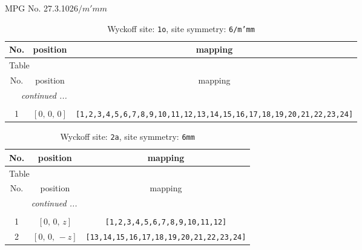 \documentclass[fleqn,8pt]{jsarticle}
\begin{document}
\setcounter{MaxMatrixCols}{32}

\renewcommand{\tablename}{Table~}
\renewcommand{\figurename}{Figure~}
\begin{center}
\LARGE
MPG No. 27.3.102\quad$6/m'mm$
\end{center}
\renewcommand{\arraystretch}{1.2}
\begin{longtable}{ccc}
\caption{Wyckoff site: {\tt 1o}, site symmetry: {\tt 6/m'mm}}
 \\
 \hline \hline
No. & position & mapping \\ \hline \endfirsthead

\multicolumn{2}{l}{\tablename\ \thetable{}} \\
 \hline \hline
No. & position & mapping \\ \hline \endhead

 \hline \hline
\multicolumn{2}{r}{\footnotesize\it continued ...} \\ \endfoot

 \hline \hline
\multicolumn{2}{r}{} \\ \endlastfoot

1 & $\left[ 0,\, 0,\, 0 \right]$ & {\tt [1,2,3,4,5,6,7,8,9,10,11,12,13,14,15,16,17,18,19,20,21,22,23,24]} \\
\end{longtable}
\renewcommand{\arraystretch}{1.2}
\begin{longtable}{ccc}
\caption{Wyckoff site: {\tt 2a}, site symmetry: {\tt 6mm}}
 \\
 \hline \hline
No. & position & mapping \\ \hline \endfirsthead

\multicolumn{2}{l}{\tablename\ \thetable{}} \\
 \hline \hline
No. & position & mapping \\ \hline \endhead

 \hline \hline
\multicolumn{2}{r}{\footnotesize\it continued ...} \\ \endfoot

 \hline \hline
\multicolumn{2}{r}{} \\ \endlastfoot

1 & $\left[ 0,\, 0,\, z \right]$ & {\tt [1,2,3,4,5,6,7,8,9,10,11,12]} \\ \hline
2 & $\left[ 0,\, 0,\, - z \right]$ & {\tt [13,14,15,16,17,18,19,20,21,22,23,24]} \\
\end{longtable}
\renewcommand{\arraystretch}{1.2}
\end{document}
